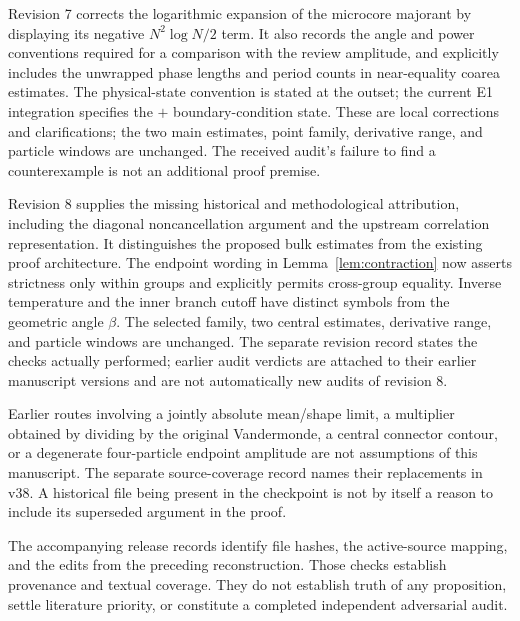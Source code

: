 Revision 7 corrects the logarithmic expansion of the microcore
majorant by displaying its negative \(N^2\log N/2\) term. It also
records the angle and power conventions required for a comparison
with the review amplitude, and explicitly includes the unwrapped
phase lengths and period counts in near-equality coarea estimates.
The physical-state convention is stated at the outset; the current
E1 integration specifies the \(+\) boundary-condition state. These are local corrections and
clarifications; the two main estimates, point family, derivative
range, and particle windows are unchanged. The received audit's
failure to find a counterexample is not an additional proof premise.

Revision 8 supplies the missing historical and methodological
attribution, including the diagonal noncancellation argument and the
upstream correlation representation. It distinguishes the proposed
bulk estimates from the existing proof architecture. The endpoint
wording in Lemma~\ref{lem:contraction} now asserts strictness only
within groups and explicitly permits cross-group equality. Inverse
temperature and the inner branch cutoff have distinct symbols from
the geometric angle \(\beta\). The selected family, two central
estimates, derivative range, and particle windows are unchanged.
The separate revision record states the checks actually performed;
earlier audit verdicts are attached to their earlier manuscript
versions and are not automatically new audits of revision 8.

Earlier routes involving a jointly absolute mean/shape
limit, a multiplier obtained by dividing by the original
Vandermonde, a central connector contour, or a degenerate
four-particle endpoint amplitude are not assumptions of
this manuscript. The separate source-coverage record names
their replacements in v38. A historical file being
present in the checkpoint is not by itself a reason to
include its superseded argument in the proof.

The accompanying release records identify file hashes, the active-source
mapping, and the edits from the preceding reconstruction.
Those checks establish provenance and textual coverage.
They do not establish truth of any proposition, settle
literature priority, or constitute a completed independent
adversarial audit.


